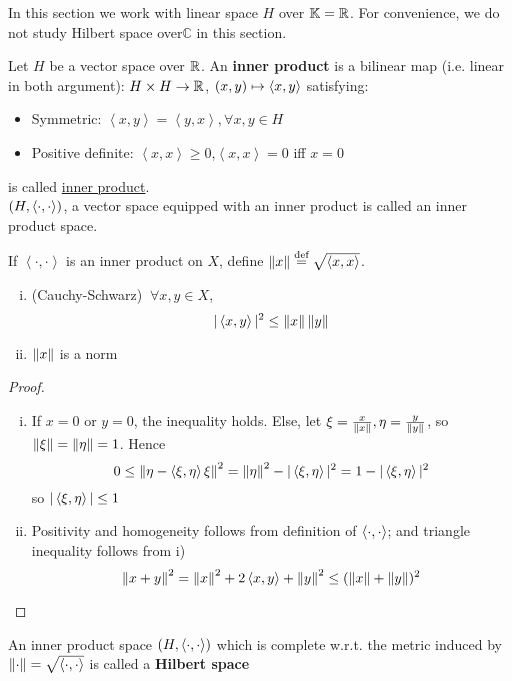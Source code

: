 \documentclass{article}
\begin{document}
In this section we work with linear space $H$ over $\mathbb{K} = \mathbb{R}$. For convenience, we do not study Hilbert space over$\mathbb{ C}$ in this section.


\begin{definition}
	Let $H$ be a vector space over $\mathbb{R}$. An {\bf inner product} is a bilinear map (i.e. linear in both argument):
	$H\times H\to\mathbb{R}$, $(x,y)\mapsto \left<{x},{y}\right>$ satisfying:
	\begin{itemize}
		\item Symmetric: $\left<x,y\right>={{\left<y,x\right>}},\forall x,y\in H$
		\item Positive definite: $\left<x,x\right>\geq0$,$\left<x,x\right>=0$ iff $x=0$
	\end{itemize}
	is called \underline{inner product}.\\
	$(H,\left<{\cdot},{\cdot}\right>)$, a vector space equipped with an inner product is called an inner product space.
\end{definition}



\begin{theorem}
	If $\left<\cdot,\cdot\right>$ is an inner product on $X$, define $\left\|{x}\right\|\overset{\textrm{def}}{=}\sqrt{\left<{x},{x}\right>}$.  
	\begin{enumerate}[i)]
	    \item (Cauchy-Schwarz) $\ \forall x,y\in X$,
	$$|\left<{x},{y}\right>|^2\leq \left\|{x}\right\| \left\|{y}\right\|$$
	\item $\left\|{x}\right\|$ is a norm
\end{enumerate}  
\end{theorem}

\begin{proof}
\begin{enumerate}[i)]
    \item If $x=0$ or $y=0$, the inequality holds. Else, let $\xi = \frac{x}{\left\|{x}\right\|}, \eta = \frac{y}{\left\|{y}\right\|}$, so $\left\|{\xi}\right\|=\left\|{\eta}\right\|=1$. Hence 
    $$0 \leq \left\|{\eta-\left<{\xi},{\eta}\right>\xi}\right\|^2=\left\|{\eta}\right\|^2 - |\left<{\xi},{\eta}\right>|^2=1-|\left<{\xi},{\eta}\right>|^2$$  
    so $|\left<{\xi},{\eta}\right>| \leq 1$
    \item Positivity and homogeneity follows from definition of $\left<{\cdot},{\cdot}\right>$; and triangle inequality follows from i)  
    $$
    \left\|{x+y}\right\|^2=\left\|{x}\right\|^2 + 2 \left<{x},{y}\right> + \left\|{y}\right\|^2 \leq (\left\|{x}\right\|+\left\|{y}\right\|)^2
    $$
\end{enumerate}
\end{proof}

\begin{definition}
    An inner product space $(H, \left<{\cdot},{\cdot}\right>)$ which is complete w.r.t. the metric induced by $\left\|{\cdot}\right\|=\sqrt{\left<{\cdot},{\cdot}\right>}$ is called a \textbf{Hilbert space}
\end{definition}
\end{document}

